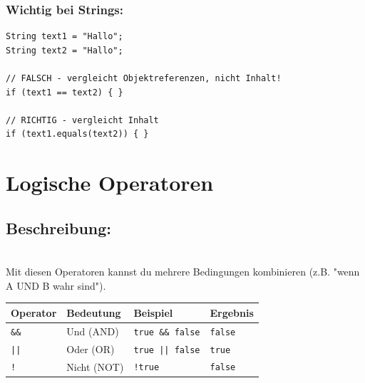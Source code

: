 \subsubsection*{Wichtig bei Strings:}
\begin{lstlisting}
String text1 = "Hallo";
String text2 = "Hallo";

// FALSCH - vergleicht Objektreferenzen, nicht Inhalt!
if (text1 == text2) { }

// RICHTIG - vergleicht Inhalt
if (text1.equals(text2)) { }
\end{lstlisting}

\newpage


\section*{Logische Operatoren}

\subsection*{Beschreibung:}\\
Mit diesen Operatoren kannst du mehrere Bedingungen kombinieren (z.B. "wenn A UND B wahr sind").

\begin{center}
	\begin{tabular}{|l|l|l|l|}
		\hline
		\textbf{Operator} & \textbf{Bedeutung} & \textbf{Beispiel} & \textbf{Ergebnis} \\
		\hline
		\texttt{\&\&} & Und (AND) & \texttt{true \&\& false} & \texttt{false} \\
		\hline
		\texttt{||} & Oder (OR) & \texttt{true || false} & \texttt{true} \\
		\hline
		\texttt{!} & Nicht (NOT) & \texttt{!true} & \texttt{false} \\
		\hline
	\end{tabular}
\end{center}

